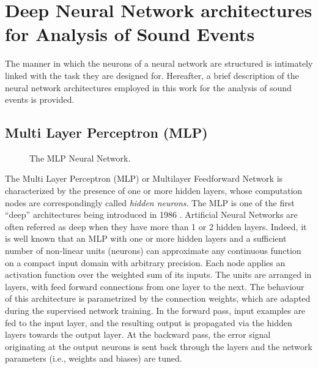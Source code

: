 \section{Deep Neural Network architectures for Analysis of Sound Events}

The manner in which the neurons of a neural network are structured is intimately linked with the task they are designed for. Hereafter, a brief description of the neural network architectures employed in this work for the analysis of sound events is provided.


\subsection{Multi Layer Perceptron (MLP)}


\begin{figure}[h]
	\centering
	\resizebox{0.75\textwidth}{!}{
	}
	\caption{The MLP Neural Network.}
	\label{fig:ANN}
\end{figure}

The Multi Layer Perceptron (MLP) or Multilayer Feedforward Network is characterized by the presence of one or more hidden layers, whose computation nodes are correspondingly called \textit{hidden neurons}.
The MLP is one of the first ``deep'' architectures being introduced in 1986 \cite{Rumelhart86-LRB}. Artificial Neural Networks are often referred as deep when they have more than 1 or 2 hidden layers.
Indeed, it is well known that an  MLP with one or more hidden layers and a sufficient number of non-linear units (neurons) can  approximate any continuous  function  on  a  compact  input  domain  with arbitrary precision.
Each node applies an activation function over the weighted sum of its inputs. 
The units are arranged in layers, with feed forward connections from one layer to the next. 
The behaviour of this architecture  is  parametrized  by  the connection weights, which are adapted during the supervised network training.
In the forward pass, input examples are fed to the input layer, and the resulting output is propagated via the hidden layers towards the output layer. At the backward pass, the error signal originating at the output neurons is sent back through the layers and the network parameters (i.e., weights and biases) are tuned.

